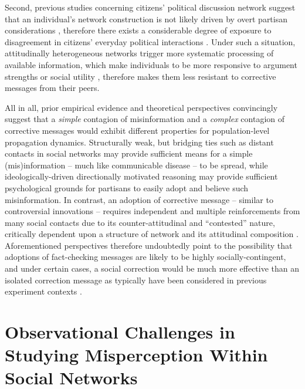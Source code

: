 \documentclass[man, 12pt, a4paper, noextraspace]{apa6}
\begin{document}
    Second, previous studies concerning citizens' political discussion network suggest that an individual's network construction is not likely driven by overt partisan considerations \parencite{song2015uncovering,lazer2010coevolution}, therefore there exists a considerable degree of exposure to disagreement in citizens' everyday political interactions \parencite[e.g.,][]{Bakshy1130, morey2012matters}. Under such a situation, attitudinally heterogeneous networks trigger more systematic processing of available information, which make individuals to be more responsive to argument strengths \parencite{levitan2008resistance} or social utility \parencite{messing2014selective}, therefore makes them less resistant to corrective messages from their peers.    

  All in all, prior empirical evidence and theoretical perspectives convincingly suggest that a \emph{simple} contagion of misinformation and a \emph{complex} contagion of corrective messages would exhibit different properties for population-level propagation dynamics. Structurally weak, but bridging ties such as distant contacts in social networks may provide sufficient means for a simple (mis)information -- much like communicable disease -- to be spread, while ideologically-driven directionally motivated reasoning may provide sufficient psychological grounds for partisans to easily adopt and believe such misinformation. In contrast, an adoption of corrective message -- similar to controversial innovations -- requires independent and multiple reinforcements from many social contacts due to its counter-attitudinal and \enquote{contested} nature, critically dependent upon a structure of network and its attitudinal composition \parencite{centola2007complex, Centola2010Sience, gonzalez2011dynamics}. Aforementioned perspectives therefore undoubtedly point to the possibility that adoptions of fact-checking messages are likely to be highly socially-contingent, and under certain cases, a social correction would be much more effective than an isolated correction message as typically have been considered in previous experiment contexts \parencite[e.g.,][]{nyhan2010corrections,garrett2013undermining}.
    

\section{Observational Challenges in Studying Misperception Within Social Networks}
\end{document}
